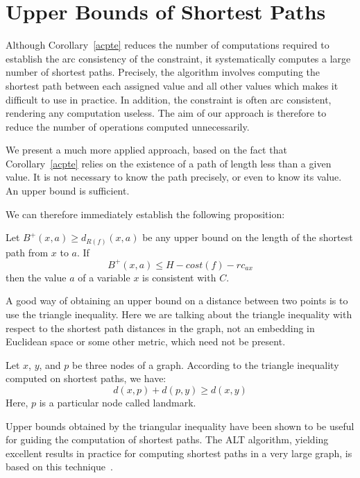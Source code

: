 \section{Upper Bounds of Shortest Paths}
\label{sec:UpperBounds}

Although Corollary~\ref{acpte} reduces the number of computations required to establish the arc consistency of the constraint, it systematically computes a large number of shortest paths. 
Precisely, the algorithm involves computing the shortest path between each assigned value and all other values which makes it difficult to use in practice. 
In addition, the constraint is often arc consistent, rendering any computation useless.
The aim of our approach is therefore to reduce the number of operations computed unnecessarily. 

We present a much more applied approach, based on the fact that Corollary~\ref{acpte} relies on the existence of a path of length less than a given value. It is not necessary to know the path precisely, or even to know its value. An upper bound is sufficient.

We can therefore immediately establish the following proposition:
    \begin{proposition}
         Let $B^+(x, a) \geq d_{R(f)}(x,a)$ be any upper bound on the length of the shortest path from $x$ to $a$. If 
            \[B^+(x, a) \leq H-cost(f)-rc_{ax}\]
        then the value $a$ of a variable $x$ is consistent with $C$.
    \end{proposition}

A good way of obtaining an upper bound on a distance between two points is to use the triangle inequality.
Here we are talking about the triangle inequality with respect to the shortest path distances in the graph, not an embedding in Euclidean space or some other metric, which need not be present.
    \begin{property}
        Let $x$, $y$, and $p$ be three nodes of a graph. According to the triangle inequality computed on shortest paths, we have:
        \[d(x, p) + d(p, y) \geq d(x, y)\]
        \label{property:triangleInequality}
        Here, $p$ is a particular node called landmark.
    \end{property}

Upper bounds obtained by the triangular inequality have been shown to be useful for guiding the computation of shortest paths. The ALT algorithm, yielding excellent results in practice for computing shortest paths in a very large graph, is based on this technique~\cite{Goldberg:ComputingtheShortestPath:ASearchMeetsGraphTheory}. 
    
